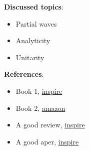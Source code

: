 \documentclass[11pt]{latex/exercise}
\begin{document}
\makeheader

\morning

\begin{minipage}{0.5\textwidth}
    \textbf{Discussed topics}:
    \begin{itemize}
        \item Partial waves
        \item Analyticity
        \item Unitarity
    \end{itemize}
\end{minipage}
\begin{minipage}{0.5\textwidth}
    \textbf{References}:
    \begin{itemize}
        \item Book 1, \href{ref_inspire}{inspire}
        \item Book 2, \href{ref_amazon}{amazon}
        \item A good review, \href{inspire}{inspire}
        \item A good aper, \href{inspire}{inspire}
    \end{itemize}
\end{minipage}
\vspace{1cm}

\afternoon

\end{document}
